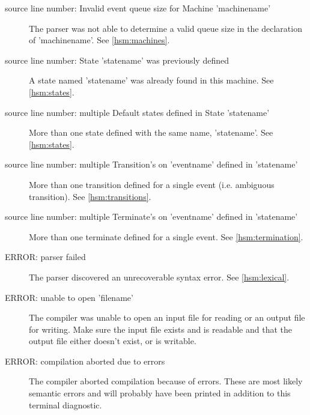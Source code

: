 \documentclass[titlepage,letterpaper]{report}
\begin{document}
\begin{description}

	\item[source line number: Invalid event queue size for Machine 'machinename']
	
        The parser was not able to determine a valid queue size in the
				declaration of 'machinename'.  See \ref{hsm:machines}.

	\item[source line number: State 'statename' was previously defined]
	
        A state named 'statename' was already found in this machine.  See \ref{hsm:states}.
					 
	\item[source line number: multiple Default states defined in State 'statename']
	
        More than one state defined with the same name, 'statename'.  See \ref{hsm:states}.

	\item[source line number: multiple Transition's on 'eventname' defined in 'statename']
	
        More than one transition defined for a single event (i.e. ambiguous transition).  See \ref{hsm:transitions}.

	\item[source line number: multiple Terminate's on 'eventname' defined in 'statename']
	
        More than one terminate defined for a single event.  See \ref{hsm:termination}.

  \item[ERROR: parser failed]
	
        The parser discovered an unrecoverable syntax error.  See \ref{hsm:lexical}.

	\item[ERROR: unable to open 'filename'] 

	      The compiler was unable to open an input file for reading or an
				output file for writing.  Make sure the input file exists and is readable and
				that the output file either doesn't exist, or is writable.

  \item[ERROR: compilation aborted due to errors]
	
        The compiler aborted compilation because of errors.  These are most likely
				semantic errors and will probably have been printed in addition to this
				terminal diagnostic.

\end{description}
\end{document}

